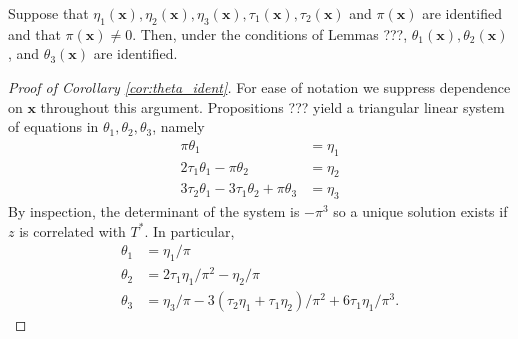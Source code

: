 \documentclass[12pt]{article}
\begin{document}
\begin{cor}
  \label{cor:theta_ident}
  Suppose that $\eta_1(\mathbf{x}), \eta_2(\mathbf{x}), \eta_3(\mathbf{x}), \tau_1(\mathbf{x}), \tau_2(\mathbf{x})$ and $\pi(\mathbf{x})$ are identified and that $\pi(\mathbf{x})\neq 0$.
  Then, under the conditions of Lemmas ???, $\theta_1(\mathbf{x}), \theta_2(\mathbf{x})$, and $\theta_3(\mathbf{x})$ are identified.
\end{cor}
\begin{proof}[Proof of Corollary \ref{cor:theta_ident}]
  For ease of notation we suppress dependence on $\mathbf{x}$ throughout this argument.
  Propositions ??? yield a triangular linear system of equations in $\theta_1, \theta_2, \theta_3$, namely
\begin{align*}
 \pi\theta_1 &= \eta_1 \\
 2\tau_1 \theta_1 - \pi \theta_2 &= \eta_2 \\
 3\tau_2 \theta_1 - 3\tau_1 \theta_2 + \pi\theta_3 &= \eta_3
\end{align*}
By inspection, the determinant of the system is $-\pi^3$ so a unique solution exists if $z$ is correlated with $T^*$.
In particular,
\begin{align*}
  \theta_1 &= \eta_1 / \pi\\
  \theta_2 &= 2\tau_1\eta_1/\pi^2 - \eta_2/\pi\\
  \theta_3 &= \eta_3/\pi - 3(\tau_2\eta_1 + \tau_1\eta_2)/\pi^2 + 6\tau_1\eta_1/\pi^3.
\end{align*}
\end{proof}
\end{document}
